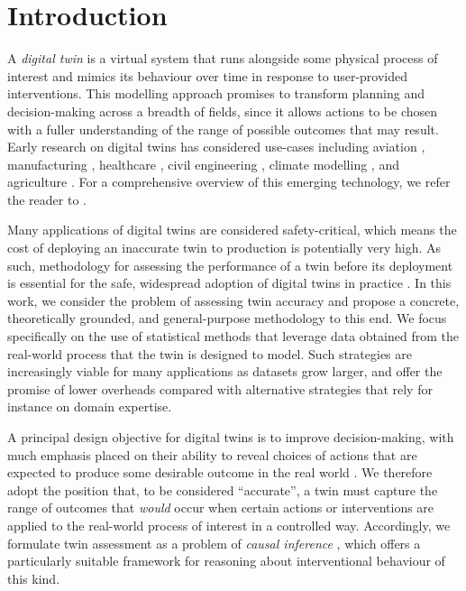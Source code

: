 \section{Introduction}

A \emph{digital twin} is a virtual system that runs alongside some physical process of interest and mimics its behaviour over time in response to user-provided interventions. 
%
This modelling approach promises to transform planning and decision-making across a breadth of fields, since it allows actions to be chosen with a fuller understanding of the range of possible outcomes that may result. %
Early research on digital twins has considered use-cases including aviation \cite{tuegel2011reengineering}, manufacturing \cite{lu2020digital}, healthcare \cite{corral2020digital,coorey2022health}, civil engineering \cite{sacks2020construction}, climate modelling \cite{bauer2021digital}, and agriculture \cite{jans2020digital}.
For a comprehensive overview of this emerging technology, we refer the reader to \cite{barricelli2019survey,jones2020characterising,niederer2021scaling}.

Many applications of digital twins are considered safety-critical, which means the cost of deploying an inaccurate twin to production is potentially very high.
%
As such, methodology for assessing the performance of a twin before its deployment is essential for the safe, widespread adoption of digital twins in practice \cite{niederer2021scaling}.
In this work, we consider the problem of assessing twin accuracy and propose a concrete, theoretically grounded, and general-purpose methodology to this end.
We focus specifically on the use of statistical methods that leverage data obtained from the real-world process that the twin is designed to model.
Such strategies are increasingly viable for many applications as datasets grow larger, and offer the promise of lower overheads compared with alternative strategies that rely for instance on domain expertise.

A principal design objective for digital twins is to improve decision-making, with much emphasis placed on their ability to reveal choices of actions that are expected to produce some desirable outcome in the real world \cite{barricelli2019survey,jones2020characterising,niederer2021scaling}.
We therefore adopt the position that, to be considered ``accurate'', a twin must capture the range of outcomes that \emph{would} occur when certain actions or interventions are applied to the real-world process of interest in a controlled way. %
%
Accordingly, we formulate twin assessment as a problem of \emph{causal inference} \cite{rubin1974estimating,rubin2005causal,pearl2009causality,hernan2020causal}, which offers a particularly suitable framework for reasoning about interventional behaviour of this kind.

